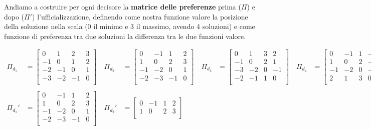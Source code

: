 \documentclass[\main/main.tex]{subfiles}
\begin{document}
Andiamo a costruire per ogni decisore la \textbf{matrice delle preferenze} prima ($\Pi$) e dopo ($\Pi'$) l'ufficializzazione, definendo come nostra funzione valore la posizione della soluzione nella scala (0 il minimo e 3 il massimo, avendo 4 soluzioni) e come funzione di preferenza tra due soluzioni la differenza tra le due funzioni valore.

\begin{align*}
	\Pi_{d_1}  & = \begin{bmatrix}
		0  & 1  & 2  & 3 \\
		-1 & 0  & 1  & 2 \\
		-2 & -1 & 0  & 1 \\
		-3 & -2 & -1 & 0 \\
	\end{bmatrix}
	\quad
	\Pi_{d_2}  & = \begin{bmatrix}
		0  & -1 & 1  & 2 \\
		1  & 0  & 2  & 3 \\
		-1 & -2 & 0  & 1 \\
		-2 & -3 & -1 & 0 \\
	\end{bmatrix}
	\quad
	\Pi_{d_3}  & = \begin{bmatrix}
		0  & 1  & 3 & 2  \\
		-1 & 0  & 2 & 1  \\
		-3 & -2 & 0 & -1 \\
		-2 & -1 & 1 & 0  \\
	\end{bmatrix}
	\quad
	\Pi_{d_4}  & = \begin{bmatrix}
		0  & -1 & 1 & -2 \\
		1  & 0  & 2 & -1 \\
		-1 & -2 & 0 & -3 \\
		2  & 1  & 3 & 0  \\
	\end{bmatrix}
	\\
	\\
	\Pi_{d_1}' & = \begin{bmatrix}
		0  & -1 & 1  & 2 \\
		1  & 0  & 2  & 3 \\
		-1 & -2 & 0  & 1 \\
		-2 & -3 & -1 & 0 \\
	\end{bmatrix}
	\quad
	\Pi_{d_2}' & = \begin{bmatrix}
		0  & -1 & 1  & 2 \\
		1  & 0  & 2  & 3 \\

\end{bmatrix}
\end{align*}
\end{document}
